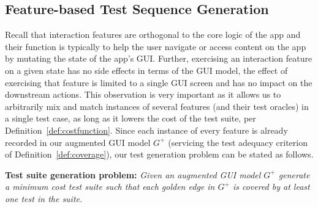 \subsection{Feature-based Test Sequence Generation}
\label{sec:traversalAlgo}

Recall that interaction features are orthogonal to the core logic of the app and their function is typically to help the user navigate or access content on the app by mutating the state of the app's GUI. Further, exercising an interaction feature on a given state has no side effects in terms of the GUI model, \ie the effect of exercising that feature is limited to a single GUI screen and has no impact on the downstream actions. This observation is very important as it allows us to arbitrarily mix and match instances of several features (and their test oracles) in a single test case, as long as it lowers the cost of the test suite, per Definition~\ref{def:costfunction}. Since each instance of every feature is already recorded in our augmented GUI model $G^+$ (servicing the test adequacy criterion of Definition~\ref{def:coverage}), our test generation problem can be stated as follows.

\noindent\textbf{Test suite generation problem:} \textit{Given an augmented GUI model $G^+$ generate a minimum cost test suite such that each golden edge in $G^+$ is covered by at least one test in the suite.}


